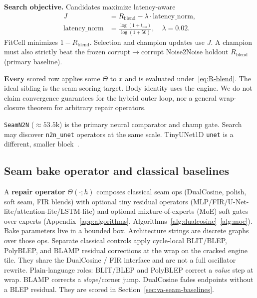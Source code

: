 \textbf{Search objective.}
Candidates maximize latency-aware
\begin{equation}
\label{eq:outer-obj}
\begin{aligned}
J&=R_{\mathrm{blend}}-\lambda\cdot\mathrm{latency\_norm},\\
\mathrm{latency\_norm}
&=\frac{\log(1+t_{\mathrm{ms}})}{\log(1+50)},
\quad \lambda=0.02.
\end{aligned}
\end{equation}
FitCell minimizes $1-R_{\mathrm{blend}}$. Selection and champion updates use $J$.
A champion must also strictly beat the frozen corrupt$\to$corrupt Noise2Noise holdout $R_{\mathrm{blend}}$ (primary baseline).

\textbf{Every} scored row applies some $\Theta$ to $x$ and is evaluated under~\eqref{eq:R-blend}.
The ideal sibling is the seam scoring target. Body identity uses the engine.
We do not claim convergence guarantees for the hybrid outer loop, nor a general wrap-closure theorem for arbitrary repair operators.

\begin{remark}
\label{rem:n2n}
\texttt{SeamN2N} (${\approx}53.5$k) is the primary neural comparator and champ gate.
Search may discover \texttt{n2n\_unet} operators at the same scale. TinyUNet1D \texttt{unet} is a different, smaller block~\cite{lehtinen2018,kashyap2021n2n}.
\end{remark}

\subsection{Seam bake operator and classical baselines}
\label{sec:bake}

A \textbf{repair operator} $\Theta(\cdot;h)$ composes classical seam ops (DualCosine, polish, soft seam, FIR blends) with optional tiny residual operators (MLP/FIR/U-Net-lite/attention-lite/LSTM-lite) and optional mixture-of-experts (MoE) soft gates over experts (Appendix~\ref{app:algorithms}, Algorithms~\ref{alg:dualcosine}--\ref{alg:moe}).
Bake parameters live in a bounded box. Architecture strings are discrete graphs over those ops.
Separate classical controls apply cycle-local BLIT/BLEP, PolyBLEP, and BLAMP residual corrections at the wrap on the cracked engine tile. They share the DualCosine / FIR interface and are not a full oscillator rewrite.
Plain-language roles: BLIT/BLEP and PolyBLEP correct a \emph{value} step at wrap. BLAMP corrects a \emph{slope}/corner jump. DualCosine fades endpoints without a BLEP residual.
They are scored in Section~\ref{sec:va-seam-baselines}.

